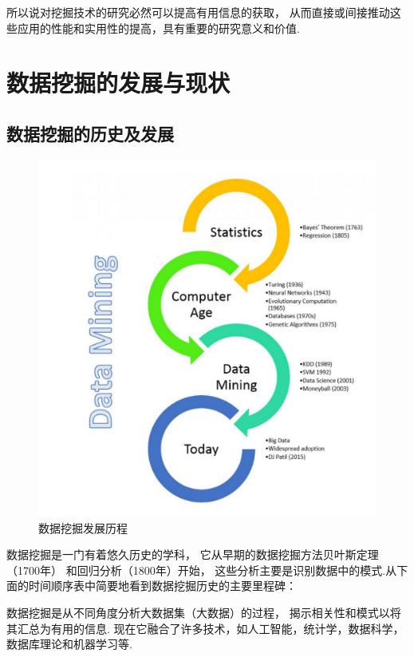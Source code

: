 \documentclass[bachelor,adobefonts]{jnuthesis}
\begin{document}

所以说对挖掘技术的研究必然可以提高有用信息的获取，
从而直接或间接推动这些应用的性能和实用性的提高，具有重要的研究意义和价值.

\section{数据挖掘的发展与现状}
\subsection{数据挖掘的历史及发展}

\begin{figure}[htp]
  \centering
  \includegraphics[width=0.6\linewidth]{shujufajuefazhan.png}
  \caption{数据挖掘发展历程}
\end{figure}

数据挖掘是一门有着悠久历史的学科，
它从早期的数据挖掘方法贝叶斯定理（1700年）\cite{邵金楠2017经典贝叶斯决策理论概述}
和回归分析（1800年）\cite{陈希孺1989最小一乘线性回归}开始，
这些分析主要是识别数据中的模式.从下面的时间顺序表中简要地看到数据挖掘历史的主要里程碑：


数据挖掘是从不同角度分析大数据集（大数据）的过程，
揭示相关性和模式以将其汇总为有用的信息.
现在它融合了许多技术，如人工智能，统计学，数据科学，数据库理论和机器学习等\cite{黄河燕2016大数据情报分析发展机遇及其挑战}.
\end{document}
